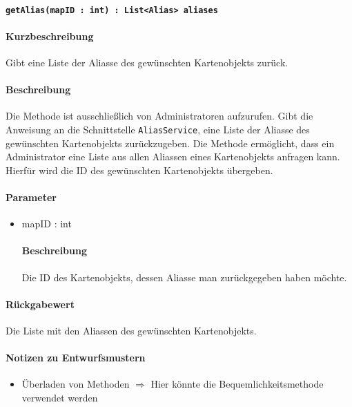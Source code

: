\paragraph{\texttt{getAlias(mapID : int) : List<Alias> aliases}}%
\paragraph*{Kurzbeschreibung}
Gibt eine Liste der Aliasse des gewünschten Kartenobjekts zurück.
\paragraph*{Beschreibung}
Die Methode ist ausschließlich von Administratoren aufzurufen.
Gibt die Anweisung an die Schnittstelle \texttt{AliasService}, eine Liste der Aliasse des gewünschten Kartenobjekts zurückzugeben.
Die Methode ermöglicht, dass ein Administrator eine Liste aus allen Aliassen eines Kartenobjekts anfragen kann.
Hierfür wird die ID des gewünschten Kartenobjekts übergeben.
\paragraph*{Parameter}
\begin{itemize}
    \item mapID : int
    		\paragraph*{Beschreibung}
    		Die ID des Kartenobjekts, dessen Aliasse man zurückgegeben haben möchte.
\end{itemize}
\paragraph*{Rückgabewert}
Die Liste mit den Aliassen des gewünschten Kartenobjekts.

\paragraph*{Notizen zu Entwurfsmustern}
\begin{itemize}
	\item Überladen von Methoden $\Rightarrow$ Hier könnte die Bequemlichkeitsmethode verwendet werden
\end{itemize}
